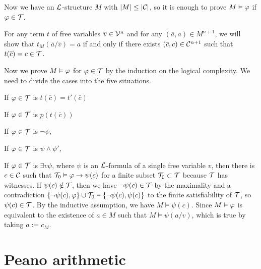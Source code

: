 \documentclass{../../large}
\begin{document}
\begin{pf}
Now we have an $\mathcal{L}$-structure $M$ with $|M|\le|\mathcal{C}|$, so it is enough to prove $M\vDash\varphi$ if $\varphi\in\mathcal{T}$.



For any term $t$ of free variables $\overline v\in\mathcal{V}^n$ and for any $(\bar a,a)\in M^{n+1}$, we will show that $t_M(\bar a/\bar v)=a$ if and only if there exists $(\overline c,c)\in\mathcal{C}^{n+1}$ such that $t(\overline c)=c\in\mathcal{T}$.

Now we prove $M\vDash\varphi$ for $\varphi\in\mathcal{T}$ by the induction on the logical complexity.
We need to divide the cases into the five situations.

If $\varphi\in\mathcal{T}$ is $t(\bar c)=t'(\bar c)$

If $\varphi\in\mathcal{T}$ is $p(t(\bar c))$

If $\varphi\in\mathcal{T}$ is $\neg\psi$,

If $\varphi\in\mathcal{T}$ is $\psi\wedge\psi'$,

If $\varphi\in\mathcal{T}$ is $\exists v\psi$, where $\psi$ is an $\mathcal{L}$-formula of a single free variable $v$, then there is $c\in\mathcal{C}$ such that $\mathcal{T}_0\vDash\varphi\to\psi(c)$ for a finite subset $\mathcal{T}_0\subset\mathcal{T}$ because $\mathcal{T}$ has witnesses.
If $\psi(c)\notin\mathcal{T}$, then we have $\neg\psi(c)\in\mathcal{T}$ by the maximality and a contradiction $\{\neg\psi(c),\varphi\}\cup\mathcal{T}_0\vDash\{\neg\psi(c),\psi(c)\}$ to the finite satisfiability of $\mathcal{T}$, so $\psi(c)\in\mathcal{T}$.
By the inductive assumption, we have $M\vDash\psi(c)$.
Since $M\vDash\varphi$ is equivalent to the existence of $a\in M$ such that $M\vDash\psi(a/v)$, which is true by taking $a:=c_M$.
\end{pf}

\section{Peano arithmetic}
\end{document}
